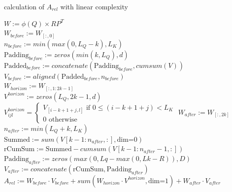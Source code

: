 \begin{algorithm}[H]
	\caption{calculation of $A_{rel}$ with linear complexity}
	\label{alg:A_rel}
	$W := \phi(Q) \times RP^T$\\
	$W_{before} := W_{[:, 0]}$\\
	$n_{before} := min(max(0, L_Q-k), L_K)$\\
	$\text{Padding}_{before} := zeros(min(k, L_Q), d)$\\
	$\text{Padded}_{before} := concatenate(\text{Padding}_{before}, cumsum(V))$\\
	$V_{before} := aligned(\text{Padded}_{before}, n_{before})$\\
	$W_{horizon} := W_{[:, 1:2k-1]}$\\
	$V^{horizon} := zeros(L_Q, 2k-1, d)$\\
	{
		{
			{
					$V^{horizon}_{ijl} =
					\begin{cases}
						V_{[i-k+1+j, l]}\text{ if }0 \leq (i-k+1+j) < L_K\\
						0\text{ otherwise} 
					\end{cases}$
			}
		}
	}
	$W_{after} := W_{[:, 2k]}$\\
	$n_{after} := min(L_Q+k, L_K)$\\
	$\text{Summed} := sum(V[k-1:n_{after}, :], \text{dim=0})$\\
	$\text{rCumSum} := \text{Summed} - cumsum(V[k-1:n_{after}-1, :])$\\
	$\text{Padding}_{after} := zeros(max(0, Lq-max(0, Lk-R)), D)$\\
	$V_{after} := concatenate(\text{rCumSum}, \text{Padding}_{after})$\\
	$A_{rel} := W_{before} \cdot V_{before} + sum(W_{horizon} \cdot V^{horizon}, \text{dim=1}) + W_{after} \cdot V_{after}$
\end{algorithm}

\endinput
